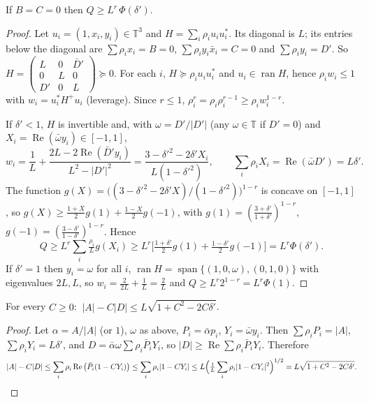 \documentclass[11pt]{article}
\theoremstyle{remark}\newtheorem{remark}[theorem]{Remark}
\renewcommand{\Re}{\operatorname{Re}}
\newcommand{\T}{\mathbb T}
\begin{document}
\begin{lemma}\label{lev}
If $B=C=0$ then $Q\ge L^r\,\Phi(\delta')$.
\end{lemma}
\begin{proof}
Let $u_i=(1,x_i,y_i)\in\T^3$ and $H=\sum_i\rho_iu_iu_i^*$.  Its diagonal is $L$; its entries below the diagonal are
$\sum\rho_ix_i=B=0$, $\sum\rho_iy_i\bar x_i=C=0$ and $\sum\rho_iy_i=D'$.  So
$H=\begin{pmatrix}L&0&\bar D'\\0&L&0\\D'&0&L\end{pmatrix}\succeq0$.
For each $i$, $H\succeq\rho_iu_iu_i^*$ and $u_i\in\operatorname{ran}H$, hence $\rho_i w_i\le1$ with $w_i=u_i^*H^+u_i$
(leverage).  Since $r\le1$, $\rho_i^r=\rho_i\rho_i^{r-1}\ge\rho_i w_i^{1-r}$.

If $\delta'<1$, $H$ is invertible and, with $\omega=D'/|D'|$ (any $\omega\in\T$ if $D'=0$) and $X_i=\Re(\bar\omega y_i)\in[-1,1]$,
\[w_i=\frac1L+\frac{2L-2\Re(\bar D'y_i)}{L^2-|D'|^2}=\frac{3-\delta'^2-2\delta'X_i}{L(1-\delta'^2)},\qquad
\sum_i\rho_iX_i=\Re(\bar\omega D')=L\delta'.\]
The function $g(X)=\big((3-\delta'^2-2\delta'X)/(1-\delta'^2)\big)^{1-r}$ is concave on $[-1,1]$, so
$g(X)\ge\frac{1+X}2g(1)+\frac{1-X}2g(-1)$, with $g(1)=(\frac{3+\delta'}{1+\delta'})^{1-r}$, $g(-1)=(\frac{3-\delta'}{1-\delta'})^{1-r}$.  Hence
\[Q\ge L^{r}\sum_i\tfrac{\rho_i}{L}g(X_i)\ge L^r\Big[\tfrac{1+\delta'}2g(1)+\tfrac{1-\delta'}2g(-1)\Big]=L^r\Phi(\delta').\]
If $\delta'=1$ then $y_i=\omega$ for all $i$, $\operatorname{ran}H=\operatorname{span}\{(1,0,\omega),(0,1,0)\}$ with eigenvalues $2L,L$,
so $w_i=\frac{2}{2L}+\frac1L=\frac2L$ and $Q\ge L^r2^{1-r}=L^r\Phi(1)$.
\end{proof}

\begin{lemma}[Jensen]\label{jen}
For every $C\ge0$: $\ |A|-C|D|\le L\sqrt{1+C^2-2C\delta'}$.
\end{lemma}
\begin{proof}
Let $\alpha=A/|A|$ (or $1$), $\omega$ as above, $P_i=\bar\alpha p_i$, $Y_i=\bar\omega y_i$.  Then $\sum\rho_iP_i=|A|$, $\sum\rho_iY_i=L\delta'$, and
$D=\bar\alpha\omega\sum\rho_i\bar P_iY_i$, so $|D|\ge\Re\sum\rho_i\bar P_iY_i$.  Therefore
\[|A|-C|D|\le\sum_i\rho_i\Re\big(\bar P_i(1-CY_i)\big)\le\sum_i\rho_i|1-CY_i|\le L\Big(\tfrac1L\sum_i\rho_i|1-CY_i|^2\Big)^{1/2}
=L\sqrt{1+C^2-2C\delta'}.\qedhere\]
\end{proof}
\end{document}
